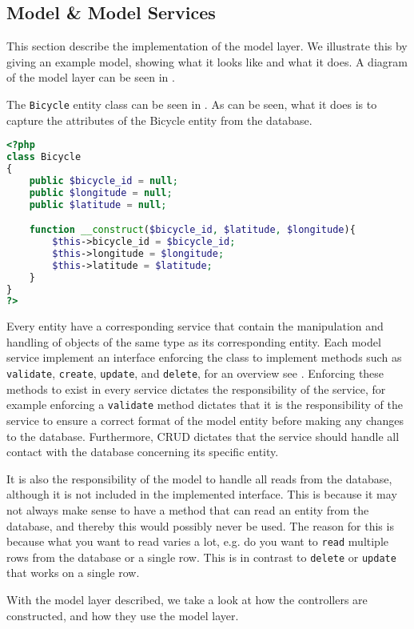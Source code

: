 \subsection{Model \& Model Services}
This section describe the implementation of the model layer. 
We illustrate this by giving an example model, showing what it looks like and what it does.
A diagram of the model layer can be seen in .

The \texttt{Bicycle} entity class can be seen in .
As can be seen, what it does is to capture the attributes of the Bicycle entity from the database.

\begin{minipage}{\textwidth}
\begin{lstlisting}[language=php, label=lst:bicycleModel, caption={Bicycle Class}]
<?php
class Bicycle
{
    public $bicycle_id = null;
    public $longitude = null;
    public $latitude = null;

    function __construct($bicycle_id, $latitude, $longitude){
        $this->bicycle_id = $bicycle_id;
        $this->longitude = $longitude;
        $this->latitude = $latitude;
    }
}
?>
\end{lstlisting}
\end{minipage}

Every entity have a corresponding service that contain the manipulation and handling of objects of the same type as its corresponding entity. 
Each model service implement an interface enforcing the class to implement methods such as \texttt{validate}, \texttt{create}, \texttt{update}, and \texttt{delete}, for an overview see . 
Enforcing these methods to exist in every service dictates the responsibility of the service, for example enforcing a \texttt{validate} method dictates that it is the responsibility of the service to ensure a correct format of the model entity before making any changes to the database. 
Furthermore, CRUD dictates that the service should handle all contact with the database concerning its specific entity.

It is also the responsibility of the model to handle all reads from the database, although it is not included in the implemented interface.
This is because it may not always make sense to have a method that can read an entity from the database, and thereby this would possibly never be used.
The reason for this is because what you want to read varies a lot, e.g. do you want to \texttt{read} multiple rows from the database or a single row.
This is in contrast to \texttt{delete} or \texttt{update} that works on a single row.

With the model layer described, we take a look at how the controllers are constructed, and how they use the model layer.